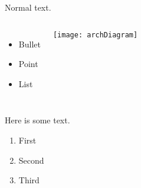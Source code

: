 


\begin{frame}
    Normal text.

    \begin{columns}
        \begin{itemize}
        \item Bullet
        \item Point
        \item List
        \end{itemize}

        \texttt{[image: archDiagram]}
      \end{columns}
    
\end{frame}



\begin{frame}

  Here is some text.  \\[2ex] %

  \begin{enumerate}
    \item First
    \item Second
    \item Third
  \end{enumerate}
  
\end{frame}